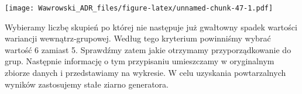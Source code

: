 \documentclass[
]{book}
\newenvironment{Shaded}{\begin{snugshade}}{\end{snugshade}}
\newcommand{\CommentTok}[1]{\textcolor[rgb]{0.56,0.35,0.01}{\textit{#1}}}
\newcommand{\ControlFlowTok}[1]{\textcolor[rgb]{0.13,0.29,0.53}{\textbf{#1}}}
\newcommand{\DataTypeTok}[1]{\textcolor[rgb]{0.13,0.29,0.53}{#1}}
\newcommand{\DecValTok}[1]{\textcolor[rgb]{0.00,0.00,0.81}{#1}}
\newcommand{\KeywordTok}[1]{\textcolor[rgb]{0.13,0.29,0.53}{\textbf{#1}}}
\newcommand{\NormalTok}[1]{#1}
\newcommand{\OperatorTok}[1]{\textcolor[rgb]{0.81,0.36,0.00}{\textbf{#1}}}
\newcommand{\StringTok}[1]{\textcolor[rgb]{0.31,0.60,0.02}{#1}}
\begin{document}
\begin{Shaded}
\end{Shaded}

\texttt{[image: Wawrowski\_ADR\_files/figure-latex/unnamed-chunk-47-1.pdf]}

Wybieramy liczbę skupień po której nie następuje już gwałtowny spadek wartości wariancji wewnątrz-grupowej. Według tego kryterium powinniśmy wybrać wartość 6 zamiast 5. Sprawdźmy zatem jakie otrzymamy przyporządkowanie do grup. Następnie informację o tym przypisaniu umieszczamy w oryginalnym zbiorze danych i przedstawiamy na wykresie. W celu uzyskania powtarzalnych wyników zastosujemy stałe ziarno generatora.

\begin{Shaded}
\end{Shaded}
\end{document}

